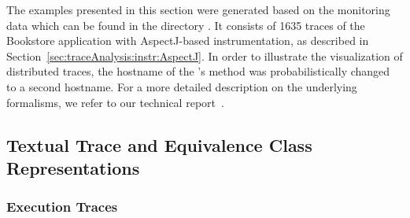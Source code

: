 \newcommand{\OPT}[1]{\texttt{#1}}
\newcommand{\OPTprintValidExecutionTraces}{-\,-print-Execution-Traces}
\newcommand{\OPTprintInvalidExecutionTraces}{-\,-print-invalid-Execution-Traces}
\newcommand{\OPTprintMessageTraces}{-\,-print-Message-Traces}
\newcommand{\OPTprintDeploymentEquivalenceClasses}{-\,-print-Deployment-Equivalence-Classes}
\newcommand{\OPTprintAssemblyEquivalenceClasses}{-\,-print-Assembly-Equivalence-Classes}
\newcommand{\OPTplotDeploymentSequenceDiagrams}{-\,-plot-Deployment-Sequence-Diagrams}
\newcommand{\OPTplotAssemblySequenceDiagrams}{-\,-plot-Assembly-Sequence-Diagrams}
\newcommand{\OPTplotCallTrees}{-\,-plotCallTrees}
\newcommand{\OPTplotAggregatedDeploymentCallTree}{-\,-plot-Aggregated-Deployment-Call-Tree}
\newcommand{\OPTplotAggregatedAssemblyCallTree}{-\,-plot-Aggregated-Assembly-Call-Tree}

\newcommand{\OPTplotContainerDependencyGraph}{-\,-plot-Container-Dependency-Graph}
\newcommand{\OPTplotDeploymentComponentDependencyGraph}{-\,-plot-Deployment-Component-Dependency-Graph}
\newcommand{\OPTplotAssemblyComponentDependencyGraph}{-\,-plot-Assembly-Component-Dependency-Graph}
\newcommand{\OPTplotDeploymentOperationDependencyGraph}{-\,-plot-Deployment-Operation-Dependency-Graph}
\newcommand{\OPTplotAssemblyOperationDependencyGraph}{-\,-plot-Assembly-Operation-Dependency-Graph}

The examples presented in this section were generated based on the %
monitoring data which can be found in the directory %
\dir{\distributedTestdataDirDistro/}. It consists of 1635 traces %
of the Bookstore application with AspectJ-based instrumentation, %
as described in Section~\ref{sec:traceAnalysis:instr:AspectJ}. %
In order to illustrate the visualization of distributed traces, %
the hostname of the 's method  was %
probabilistically changed to a second hostname. %
For a more detailed description on the underlying formalisms, %
we refer to our technical report~\cite{vanHoornRohrHasselbringWallerEhlersFreyKieselhorst2009TRContinuousMonitoringOfSoftwareServicesDesignAndApplicationOfTheKiekerFramework}.

\subsection{Textual Trace and Equivalence Class Representations}

\subsubsection{Execution Traces}\label{sec:example:executionTraces}%

